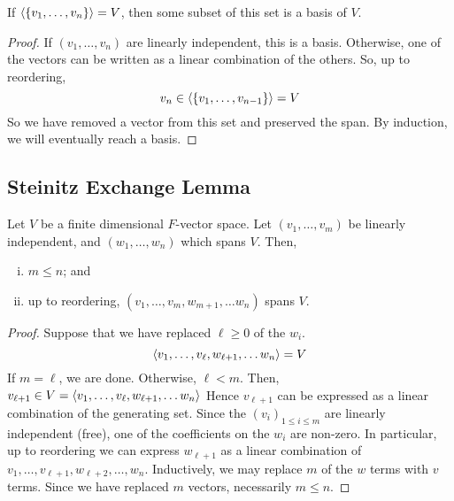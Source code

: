 \begin{lemma}
    If \( \langle{} \qty{v_1, \dots, v_n} \rangle = V \), then some subset of this set is a basis of \( V \).
\end{lemma}
\begin{proof}
    If \( (v_1, \dots, v_n) \) are linearly independent, this is a basis.
    Otherwise, one of the vectors can be written as a linear combination of the others.
    So, up to reordering,
    \[ v_n \in \langle{} \qty{v_1, \dots, v_{n-1}} \rangle = V \]
    So we have removed a vector from this set and preserved the span.
    By induction, we will eventually reach a basis.
\end{proof}

\subsection{Steinitz Exchange Lemma}
\begin{theorem}
    Let \( V \) be a finite dimensional \( F \)-vector space.
    Let \( (v_1, \dots, v_m) \) be linearly independent, and \( (w_1, \dots, w_n) \) which spans \( V \).
    Then,
    \begin{enumerate}[(i)]
        \item \( m \leq n \); and
        \item up to reordering, \( (v_1, \dots, v_m, w_{m+1}, \dots w_n) \) spans \( V \).
    \end{enumerate}
\end{theorem}
\begin{proof}
    Suppose that we have replaced \( \ell \geq 0 \) of the \( w_i \).
    \[ \langle{} v_1, \dots, v_\ell, w_{\ell+1}, \dots w_n \rangle = V \]
    If \( m = \ell \), we are done.
    Otherwise, \( \ell < m \).
    Then,
    \( v_{\ell + 1} \in V = \langle{} v_1, \dots, v_\ell, w_{\ell+1}, \dots w_n \rangle \)
    Hence \( v_{\ell + 1} \) can be expressed as a linear combination of the generating set.
    Since the \( (v_i)_{1 \leq i \leq m} \) are linearly independent (free), one of the coefficients on the \( w_i \) are non-zero.
    In particular, up to reordering we can express \( w_{\ell+1} \) as a linear combination of \( v_1, \dots, v_{\ell + 1}, w_{\ell + 2}, \dots, w_n \).
    Inductively, we may replace \( m \) of the \( w \) terms with \( v \) terms.
    Since we have replaced \( m \) vectors, necessarily \( m \leq n \).
\end{proof}
